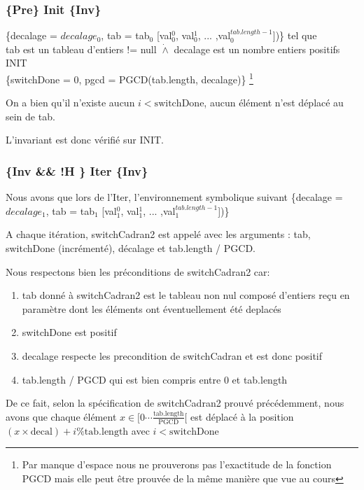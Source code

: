 \subsubsection*{\{Pre\} Init \{Inv\}}

\{decalage = $decalage_{0}$, tab = tab$_{0}$ [val$_{0}^{0}$, val$_{0}^{1}$, ... ,val$_{0}^{tab.length-1}$])\} tel que \\tab est un tableau d'entiers != null
$\dot{\wedge}$ decalage est un nombre entiers positifs\\

INIT\\

\{switchDone = 0, pgcd = PGCD(tab.length, decalage)\} \footnote{Par manque d'espace nous ne prouverons pas l'exactitude de la fonction PGCD mais elle peut être prouvée de la même manière que vue au cours}

On a bien qu'il n'existe aucun $i < \mathrm{switchDone}$, aucun élément n'est déplacé au sein de tab.

L'invariant est donc vérifié sur INIT.

\subsubsection*{\{Inv \&\& !H \} Iter \{Inv\}}

Nous avons que lors de l'Iter, l'environnement symbolique suivant \{decalage = $decalage_{1}$, tab = tab$_{1}$ [val$_{1}^{0}$, val$_{1}^{1}$, ... ,val$_{1}^{tab.length-1}$])\}

A chaque itération, switchCadran2 est appelé avec les arguments : tab,
switchDone (incrémenté), décalage et tab.length / PGCD.

Nous respectons bien les préconditions de switchCadran2 car:
\begin{enumerate}
 \item tab donné à switchCadran2 est le tableau non nul composé d'entiers reçu en paramètre dont les éléments ont éventuellement été deplacés
 \item switchDone est positif
 \item decalage respecte les precondition de switchCadran et est donc positif
 \item tab.length / PGCD qui est bien compris entre 0 et tab.length
\end{enumerate}


De ce fait,
selon la spécification de switchCadran2 prouvé précédemment, nous avons
que chaque élément $x \in [0\cdots
    \frac{\mathrm{tab.length}}{\mathrm{PGCD}}[$ est déplacé à la
        position $(x\times \mathrm{decal})+i \% \mathrm{tab.length}$ avec $i < \mathrm{switchDone}$

